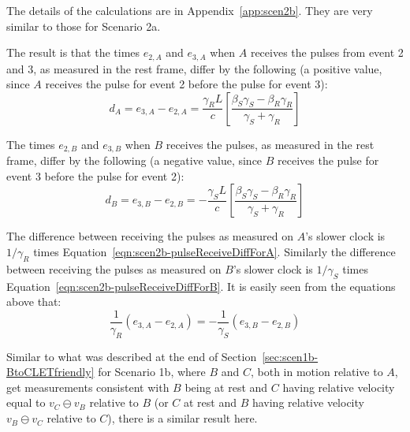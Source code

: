 \documentclass[a4paper]{article}
\theoremstyle{plain}
\theoremstyle{definition}
\begin{document}
The details of the calculations are in Appendix~\ref{app:scen2b}.
They are very similar to those for Scenario 2a.

The result is that the times $e_{2,A}$ and $e_{3,A}$ when $A$ receives
the pulses from event 2 and 3, as measured in the rest frame, differ
by the following (a positive value, since $A$ receives the pulse for
event 2 before the pulse for event 3):
\begin{equation}
d_A
  = e_{3,A}-e_{2,A}
  = \frac{\gamma_R L}{c} \left[ \frac{\beta_S\gamma_S - \beta_R\gamma_R}{\gamma_S + \gamma_R} \right] \label{eqn:scen2b-pulseReceiveDiffForA}
\end{equation}

The times $e_{2,B}$ and $e_{3,B}$ when $B$ receives the pulses, as
measured in the rest frame, differ by the following (a negative value,
since $B$ receives the pulse for event 3 before the pulse for event
2):
\begin{equation}
d_B
  = e_{3,B}-e_{2,B}
  = -\frac{\gamma_S L}{c} \left[ \frac{\beta_S\gamma_S - \beta_R\gamma_R}{\gamma_S + \gamma_R} \right] \label{eqn:scen2b-pulseReceiveDiffForB}
\end{equation}

The difference between receiving the pulses as measured on $A$'s
slower clock is $1/\gamma_R$ times
Equation~\eqref{eqn:scen2b-pulseReceiveDiffForA}.  Similarly the
difference between receiving the pulses as measured on $B$'s slower
clock is $1/\gamma_S$ times
Equation~\eqref{eqn:scen2b-pulseReceiveDiffForB}.  It is easily seen
from the equations above that:
\begin{equation}
\frac{1}{\gamma_R} (e_{3,A}-e_{2,A}) = -\frac{1}{\gamma_S} (e_{3,B}-e_{2,B})
\end{equation}

Similar to what was described at the end of
Section~\ref{sec:scen1b-BtoCLETfriendly} for Scenario 1b, where $B$
and $C$, both in motion relative to $A$, get measurements consistent
with $B$ being at rest and $C$ having relative velocity equal to
$v_C \ominus v_B$ relative to $B$ (or $C$ at rest and $B$ having
relative velocity $v_B \ominus v_C$ relative to $C$), there is a
similar result here.
\end{document}
